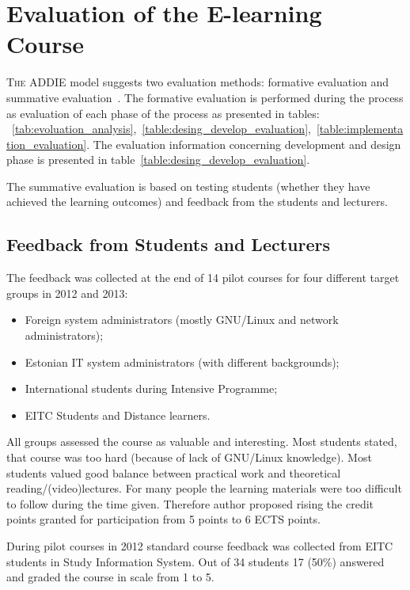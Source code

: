 \chapter{Evaluation of the E-learning Course}
\label{Evaluation of the E-learning Course}
\lettrine[lraise=0.1, nindent=0em, slope=-.5em]{\color{Violet}T}{he} \gls{ADDIE} model suggests two evaluation methods: formative evaluation and summative evaluation~\citep{OppeArenduskeskus2010}. The formative evaluation is performed during the process as evaluation of each phase of the process as presented in tables: ~\ref{tab:evoluation_analysis},~\ref{table:desing_develop_evaluation},~\ref{table:implementation_evaluation}. 
The evaluation information concerning development and design phase is presented in table~\ref{table:desing_develop_evaluation}.

The summative evaluation is based on testing students (whether they have achieved  the learning outcomes) and feedback from the students and lecturers.

\section{Feedback from Students and Lecturers}
The feedback was collected at the end of 14 pilot courses for four different target groups in 2012 and 2013:

\begin{itemize}
\item Foreign system administrators (mostly GNU/Linux and network administrators);
\item Estonian IT system administrators (with different backgrounds);
\item International students during Intensive Programme;
\item \gls{EITC} Students and Distance learners.
\end{itemize}

All groups assessed the course as valuable and interesting. Most students stated, that course was too hard (because of  lack of GNU/Linux knowledge). Most students valued good balance between practical work and theoretical reading/(video)lectures. For many people the learning materials were too difficult to follow during the time given. Therefore author proposed  rising the credit points granted for participation from 5 points  to 6 \gls{ECTS} points.

During pilot courses in 2012 standard course feedback was collected from \gls{EITC} students in Study Information System. Out of 34 students 17 (50\%) answered  and graded the course in scale from 1 to 5.


